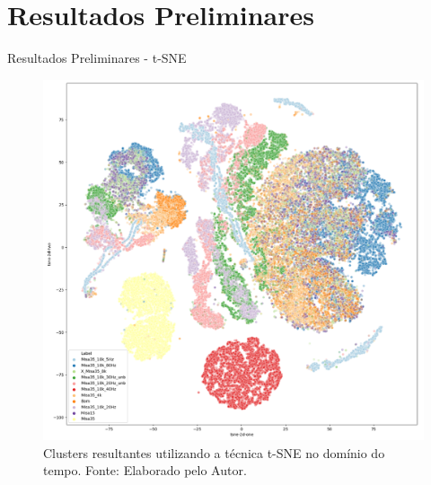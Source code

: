 \documentclass[aspectratio=169]{beamer}
\begin{document}
\section{Resultados Preliminares}
\begin{frame}{Resultados Preliminares - t-SNE}
	\begin{figure}[HT]
		\begin{center}
			\includegraphics[scale=.19]{../resultados/img/t-sne-1.png}
			\caption{Clusters resultantes utilizando a técnica t-SNE no domínio do tempo. \newline
			Fonte: Elaborado pelo Autor.}
			\label{fig:t-sne-1}
		\end{center}
	\end{figure}
\end{frame}

\end{document}

